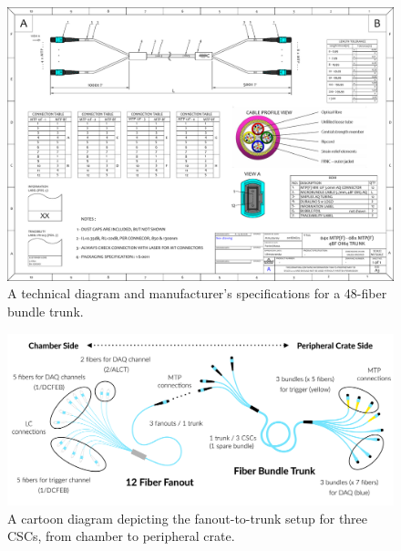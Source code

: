 \begin{figure}[H]
    \centering
    \includegraphics[width=1\textwidth]{Images/Phase2Upgrades/OpticalFibers/TRUNK_C2202.pdf}
    \caption{A technical diagram and manufacturer's specifications for a 48-fiber bundle trunk.}
    \label{fig:trunkspecs}
\end{figure}

\begin{figure}[H]
    \centering
    \includegraphics[width=1\textwidth]{Images/Phase2Upgrades/OpticalFibers/FanoutTrunkCartoon.png}
    \caption{A cartoon diagram depicting the fanout-to-trunk setup for three CSCs, from chamber to peripheral crate.}
    \label{fig:fanouttrunkcartoon}
\end{figure}


